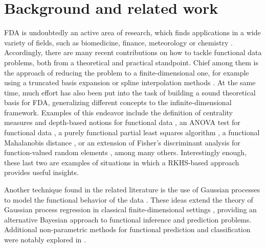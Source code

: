 %
%

\let\epsilon\varepsilon

\chapter{Background and related work}\label{ch:background}

FDA is undoubtedly an active area of research, which finds applications in a wide variety of fields, such as biomedicine, finance, meteorology or chemistry \citep[see for example][]{ullah2013applications}. Accordingly, there are many recent contributions on how to tackle functional data problems, both from a theoretical and practical standpoint. Chief among them is the approach of reducing the problem to a finite-dimensional one, for example using a truncated basis expansion or spline interpolation methods \citep[e.g.][]{muller2005generalized, aguilera2013comparative}. At the same time, much effort has also been put into the task of building a sound theoretical basis for FDA, generalizing different concepts to the infinite-dimensional framework. Examples of this endeavor include the definition of centrality measures and depth-based notions for functional data \citep[e.g.][]{fraiman2001trimmed, cuevas2007robust, lopez2009concept}, an ANOVA test for functional data \citep{cuevas2004anova}, a purely functional partial least squares algorithm \citep{delaigle2012methodology}, a functional Mahalanobis distance \citep{berrendero2020mahalanobis}, or an extension of Fisher's discriminant analysis for function-valued random elements \citep[e.g.][]{james2001functional, shin2008extension}, among many others. Interestingly enough, these last two are examples of situations in which a RKHS-based approach provides useful insights.

Another technique found in the related literature is the use of Gaussian processes to model the functional behavior of the data \citep[see for instance][]{shi2011gaussian}. These ideas extend the theory of Gaussian process regression in classical finite-dimensional settings \citep[e.g.][]{rasmussen2004gaussian}, providing an alternative Bayesian approach to functional inference and prediction problems. Additional non-parametric methods for functional prediction and classification were notably explored in \citet{ferraty2006nonparametric}.

